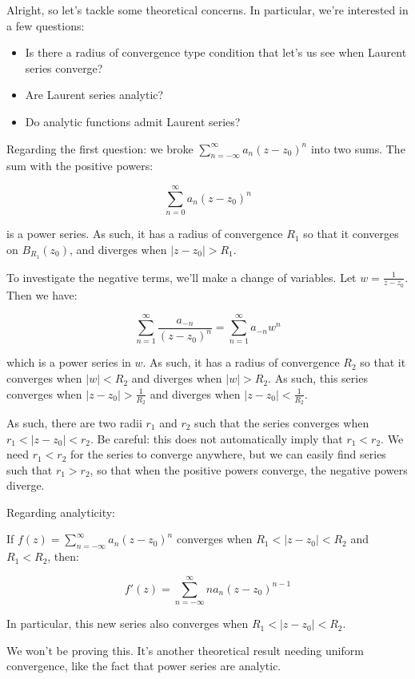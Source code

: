 Alright, so let's tackle some theoretical concerns. In particular, we're interested in a few questions:

\begin{itemize}
\item Is there a radius of convergence type condition that let's us see when Laurent series converge?
\item Are Laurent series analytic?
\item Do analytic functions admit Laurent series?
\end{itemize}

Regarding the first question: we broke $\sum_{n = -\infty}^\infty a_n(z-z_0)^n$ into two sums. The sum with the positive powers:

$$\sum_{n = 0}^\infty a_n(z-z_0)^n$$

\noin is a power series. As such, it has a radius of convergence $R_1$ so that it converges on $B_{R_1}(z_0)$, and diverges when $|z-z_0| > R_1$.

To investigate the negative terms, we'll make a change of variables. Let $w = \frac{1}{z-z_0}$. Then we have:

$$\sum_{n = 1}^\infty \frac{a_{-n}}{(z-z_0)^n} = \sum_{n = 1}^\infty a_{-n}w^n$$

\noin which is a power series in $w$. As such, it has a radius of convergence $R_2$ so that it converges when $|w| < R_2$ and diverges when $|w| > R_2$. As such, this series converges when $|z-z_0| > \frac{1}{R_2}$ and diverges when $|z-z_0| < \frac{1}{R_2}$.

As such, there are two radii $r_1$ and $r_2$ such that the series converges when $r_1 < |z-z_0| < r_2$. Be careful: this does not automatically imply that $r_1 < r_2$. We need $r_1 < r_2$ for the series to converge anywhere, but we can easily find series such that $r_1 > r_2$, so that when the positive powers converge, the negative powers diverge.

Regarding analyticity:

\begin{thmbo}{}{} If $f(z) = \sum_{n = -\infty}^\infty a_n(z-z_0)^n$ converges when $R_1 < |z-z_0| < R_2$ and $R_1 < R_2$, then:

$$f'(z) = \sum_{n = -\infty}^\infty na_n(z-z_0)^{n-1}$$

\noin In particular, this new series also converges when $R_1 < |z-z_0| <R_2$.
\end{thmbo}

We won't be proving this. It's another theoretical result needing uniform convergence, like the fact that power series are analytic.

